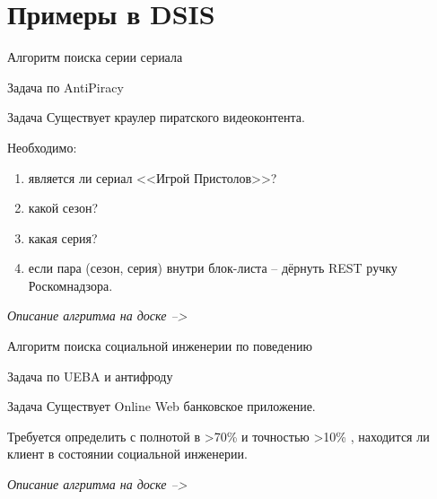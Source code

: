 
\section{Примеры в DSIS}\label{section:examples_2_dsis}

\begin{frame}{Алгоритм поиска серии сериала}
	
	Задача по AntiPiracy
	
	\begin{block}{Задача}
		Существует краулер пиратского видеоконтента.
		
		Необходимо:
		\begin{enumerate}
			\item является ли сериал <<Игрой Пристолов>>?
			\item какой сезон?
			\item какая серия?
			\item если пара (сезон, серия) внутри блок-листа -- дёрнуть REST ручку Роскомнадзора.
		\end{enumerate}
	\end{block}
	
	\textit{Описание алгритма на доске --> }
	
	
\end{frame}


\begin{frame}{Алгоритм поиска социальной инженерии по поведению}
	
	Задача по UEBA и антифроду
	
	\begin{block}{Задача}
		Существует Online Web банковское приложение.
		
		Требуется определить с полнотой в >70\% и точностью >10\% , находится ли клиент в состоянии социальной инженерии.
	
	\end{block}
	
	\textit{Описание алгритма на доске --> }
	
	
\end{frame}


